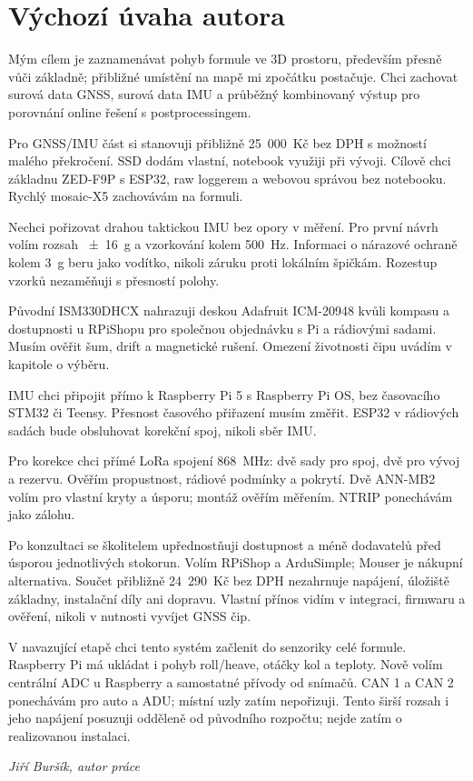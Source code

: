 \chapter*{Výchozí úvaha autora}

Mým cílem je zaznamenávat pohyb formule ve 3D prostoru, především přesně
vůči základně; přibližné umístění na mapě mi zpočátku postačuje.
Chci zachovat surová data GNSS, surová data IMU a průběžný kombinovaný
výstup pro porovnání online řešení s postprocessingem.

Pro GNSS/IMU část si stanovuji přibližně 25~000~Kč bez DPH s možností
malého překročení. SSD dodám vlastní, notebook využiji při vývoji.
Cílově chci základnu ZED-F9P s ESP32, raw loggerem a webovou správou
bez notebooku. Rychlý mosaic-X5 zachovávám na formuli.

Nechci pořizovat drahou taktickou IMU bez opory v měření. Pro první návrh
volím rozsah \SI{\pm16}{g} a vzorkování kolem \SI{500}{Hz}. Informaci o
nárazové ochraně kolem \SI{3}{g} beru jako vodítko, nikoli záruku proti
lokálním špičkám. Rozestup vzorků nezaměňuji s přesností polohy.

Původní ISM330DHCX nahrazuji deskou Adafruit ICM-20948 kvůli kompasu
a dostupnosti u RPiShopu pro společnou objednávku s Pi a rádiovými sadami.
Musím ověřit šum, drift a magnetické rušení. Omezení životnosti čipu
uvádím v kapitole o výběru.

IMU chci připojit přímo k Raspberry Pi 5 s Raspberry Pi OS, bez časovacího
STM32 či Teensy. Přesnost časového přiřazení musím změřit. ESP32 v rádiových
sadách bude obsluhovat korekční spoj, nikoli sběr IMU.

Pro korekce chci přímé LoRa spojení 868~MHz: dvě sady pro spoj, dvě
pro vývoj a rezervu. Ověřím propustnost, rádiové podmínky a pokrytí.
Dvě ANN-MB2 volím pro vlastní kryty a úsporu; montáž ověřím měřením.
NTRIP ponechávám jako zálohu.

Po konzultaci se školitelem upřednostňuji dostupnost a méně dodavatelů před
úsporou jednotlivých stokorun. Volím RPiShop a ArduSimple; Mouser je
nákupní alternativa. Součet přibližně 24~290~Kč bez DPH nezahrnuje
napájení, úložiště základny, instalační díly ani dopravu. Vlastní přínos
vidím v integraci, firmwaru a ověření, nikoli v nutnosti vyvíjet GNSS čip.

V navazující etapě chci tento systém začlenit do senzoriky celé formule.
Raspberry Pi má ukládat i pohyb roll/heave, otáčky kol a teploty.
Nově volím centrální ADC u Raspberry a samostatné přívody od snímačů.
CAN 1 a CAN 2 ponechávám pro auto a ADU; místní uzly zatím nepořizuji.
Tento širší rozsah i jeho napájení posuzuji
odděleně od původního rozpočtu; nejde zatím o realizovanou instalaci.

\begin{flushright}
  \textit{Jiří Buršík, autor práce}
\end{flushright}
